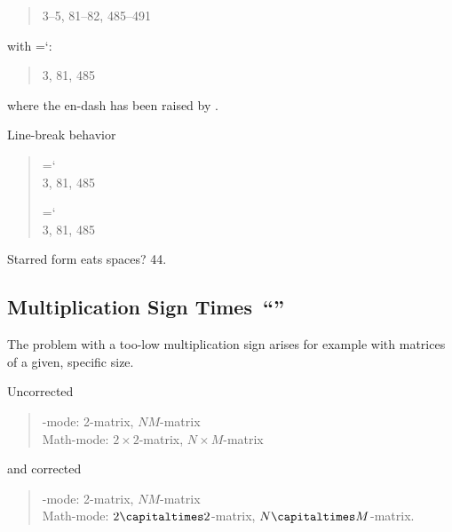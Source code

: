 \documentclass[a4paper]{article}
\newcommand*{\acronym}[1]{\mbox{\letterspacecapitals{\MakeUppercase{#1}}}}
\newcommand*{\code}[1]{{\ttfamily\hyphenchar\font=`\-\relax #1}}
\newcommand*{\letterspacecapitals}[1]{\textls[30]{#1}}
\begin{document}
\begin{quote}
 3--5, 81--82, 485--491
\end{quote}

\noindent with \code{\string\figuredash}:

\begin{quote}
  3, 81, 485
\end{quote}

\noindent where the en-dash has been raised by \the\exemplaryraisefiguredash.

\noindent Line-break behavior

\begin{quote}
  \setlength{\overfullrule}{0pt}
  \parbox[t]{0pt}{%
    \code{\string\figuredash*}  \\
    3, 81, 485
  }
  \hspace{80pt}
  \parbox[t]{0pt}{%
    \code{\string\figuredash}  \\
    3, 81, 485
  }
\end{quote}

\noindent Starred form eats spaces?  44.

\subsection{Multiplication Sign \capitaldash{} Times~``\texttimes''}

\newlength{\exemplaryraisetimes}
\setlength{\exemplaryraisetimes}{.6667pt}
The problem with a too-low multiplication sign arises
for example with matrices of a given, specific size.

\noindent Uncorrected

\begin{quote}
  \acronym{LR}-mode: 2-matrix, \(N\)\texttimes\(M\)-matrix  \\
  Math-mode: \(2\times2\)-matrix, \(N\times M\)-matrix
\end{quote}

\noindent and corrected

\begin{quote}
  \acronym{LR}-mode: 2-matrix, \(N\)\capitaltimes\(M\)-matrix  \\
  Math-mode: \(2\capitaltimes2\)-matrix, \(N\capitaltimes M\)-matrix.
\end{quote}
\end{document}
